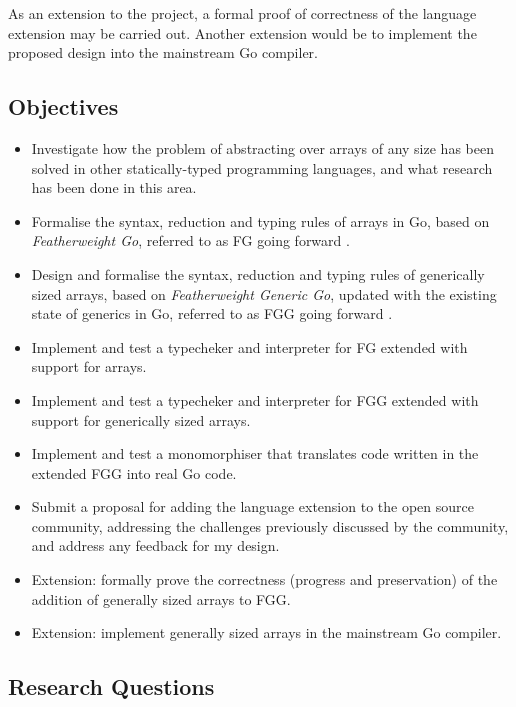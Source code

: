 As an extension to the project, a formal proof of correctness of the language
extension may be carried out. Another extension would be to implement the
proposed design into the mainstream Go compiler.

\subsection{Objectives}

\begin{itemize}
      \item Investigate how the problem of abstracting over arrays of any size
            has been solved in other statically-typed programming languages, and what
            research has been done in this area.
      \item Formalise the syntax, reduction and typing rules of arrays in Go,
            based on \emph{Featherweight Go}, referred to as FG going forward
            \autocite{fg}.
      \item Design and formalise the syntax, reduction and typing rules of
            generically sized arrays, based on \emph{Featherweight Generic Go},
            updated with the existing state of generics in Go, referred to as
            FGG going forward \autocite{fg}.
      \item Implement and test a typecheker and interpreter for FG extended with
            support for arrays.
      \item Implement and test a typecheker and interpreter for FGG extended with
            support for generically sized arrays.
      \item Implement and test a monomorphiser that translates code written in the
            extended FGG into real Go code.
      \item Submit a proposal for adding the language extension to the open
            source community, addressing the challenges previously discussed by
            the community, and address any feedback for my design.
      \item Extension: formally prove the correctness (progress and
            preservation) of the addition of generally sized arrays to FGG.
      \item Extension: implement generally sized arrays in the mainstream Go
            compiler.
\end{itemize}

\subsection{Research Questions}

